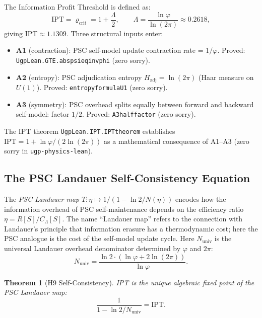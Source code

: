 \documentclass[11pt]{article}
\newtheorem{theorem}{Theorem}[section]
\theoremstyle{remark}
\newcommand{\IPT}{\mathrm{IPT}}
\newcommand{\lean}[1]{%
  \penalty-100
  \begingroup
  \def\_{\textunderscore\allowbreak}%
  \texttt{#1}%
  \endgroup
}
\newcommand{\goldenratio}{\varphi}
\begin{document}
The Information Profit Threshold is defined \cite{SpivackIPT} as:
\begin{equation}
\label{eq:ipt}
\IPT = \varrho_{\mathrm{crit}} = 1 + \frac{\Lambda}{2}, \qquad
\Lambda = \frac{\ln\goldenratio}{\ln(2\pi)} \approx 0.2618,
\end{equation}
giving $\IPT \approx 1.1309$. Three structural inputs enter:
\begin{itemize}[leftmargin=2.5em]
\item \textbf{A1} (contraction): PSC self-model update contraction rate = $1/\goldenratio$.
  Proved: \lean{UgpLean.GTE.abs\_psi\_eq\_inv\_phi} (zero sorry).
\item \textbf{A2} (entropy): PSC adjudication entropy $H_{\mathrm{adj}} = \ln(2\pi)$
  (Haar measure on $U(1)$). Proved: \lean{entropy\_formula\_U1} (zero sorry).
\item \textbf{A3} (symmetry): PSC overhead splits equally between forward and backward
  self-model: factor $1/2$. Proved: \lean{A3\_half\_factor} (zero sorry).
\end{itemize}

The IPT theorem \lean{UgpLean.IPT.IPT\_theorem} establishes
$\IPT = 1 + \ln\goldenratio / (2\ln(2\pi))$ as a mathematical consequence of A1--A3
(zero sorry in \texttt{ugp-physics-lean}).

\subsection{The PSC Landauer Self-Consistency Equation}
\label{sec:landauer}

The \emph{PSC Landauer map} $T: \eta \mapsto 1/(1 - \ln 2 / N(\eta))$ encodes
how the information overhead of PSC self-maintenance depends on the efficiency ratio
$\eta = R[S]/C_\Lambda[S]$. The name ``Landauer map'' refers to the connection with
Landauer's principle \cite{Landauer1961} that information erasure has a thermodynamic
cost; here the PSC analogue is the cost of the self-model update cycle.
Here $N_{\text{univ}}$ is the universal Landauer
overhead denominator determined by $\goldenratio$ and $2\pi$:
\begin{equation}
N_{\text{univ}} = \frac{\ln 2 \cdot (\ln\goldenratio + 2\ln(2\pi))}{\ln\goldenratio}.
\end{equation}

\begin{theorem}[H9 Self-Consistency]
\label{thm:h9}
IPT is the unique algebraic fixed point of the PSC Landauer map:
\begin{equation}
\frac{1}{1 - \ln 2 / N_{\text{univ}}} = \IPT.
\end{equation}
\end{theorem}
\end{document}
